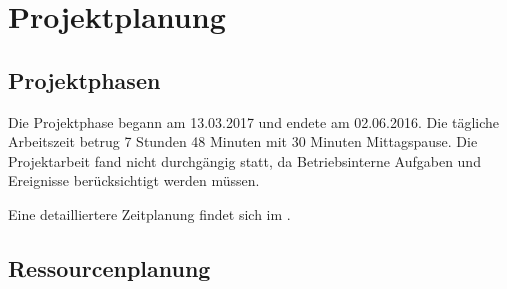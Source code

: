 
\clearpage
\section{Projektplanung} 
\label{sec:Projektplanung}


\subsection{Projektphasen}
\label{sec:Projektphasen}

Die Projektphase begann am 13.03.2017 und endete am 02.06.2016.
Die tägliche Arbeitszeit betrug 7 Stunden 48 Minuten mit 30 Minuten Mittagspause.
Die Projektarbeit fand nicht durchgängig statt, da Betriebsinterne Aufgaben und Ereignisse berücksichtigt werden müssen.


Eine detailliertere Zeitplanung findet sich im .

%

\subsection{Ressourcenplanung}
\label{sec:Ressourcenplanung}

